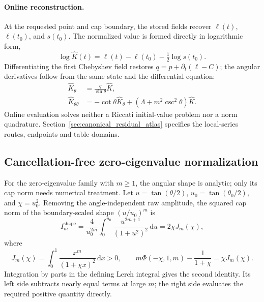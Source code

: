 ﻿\documentclass[11pt,a4paper]{article}
\newcommand{\dd}{\mathrm{d}}
\begin{document}
\paragraph{Online reconstruction.}
At the requested point and cap boundary, the stored fields recover $\ell(t)$, $\ell(t_0)$, and $s(t_0)$. The normalized value is formed directly in logarithmic form,
\begin{equation}
 \log\widehat K(t)=\ell(t)-\ell(t_0)-\tfrac12\log s(t_0).
 \label{eq:mehler_online_log}
\end{equation}
Differentiating the first Chebyshev field restores $q=p+\partial_t(\ell-C)$; the angular derivatives follow from the same state and the differential equation:
\begin{align}
 \widehat K_\theta&=\frac{q}{\sin\theta}\widehat K,\\
 \widehat K_{\theta\theta}&=-\cot\theta\widehat K_\theta
 +(\Lambda+m^2\csc^2\theta)\widehat K.
\end{align}
Online evaluation solves neither a Riccati initial-value problem nor a norm quadrature. Section~\ref{sec:canonical_residual_atlas} specifies the local-series routes, endpoints and table domains.

\subsection{Cancellation-free zero-eigenvalue normalization}
\label{sec:constant_algorithm}

For the zero-eigenvalue family with $m\geq1$, the angular shape is analytic; only its cap norm needs numerical treatment. Let $u=\tan(\theta/2)$, $u_0=\tan(\theta_0/2)$, and $\chi=u_0^2$. Removing the angle-independent raw amplitude, the squared cap norm of the boundary-scaled shape $(u/u_0)^m$ is
\begin{equation}
 I_m^{\mathrm{shape}}
 =\frac{4}{u_0^{2m}}\int_0^{u_0}\frac{u^{2m+1}}{(1+u^2)^2}\,\dd u
 =2\chi J_m(\chi),
 \label{eq:constant_norm_direct}
\end{equation}
where
\begin{equation}
 J_m(\chi)=\int_0^1\frac{x^m}{(1+\chi x)^2}\,\dd x>0,
 \qquad
 m\Phi(-\chi,1,m)-\frac{1}{1+\chi}=\chi J_m(\chi).
 \label{eq:constant_positive_integral}
\end{equation}
Integration by parts in the defining Lerch integral gives the second identity. Its left side subtracts nearly equal terms at large $m$; the right side evaluates the required positive quantity directly.
\end{document}
